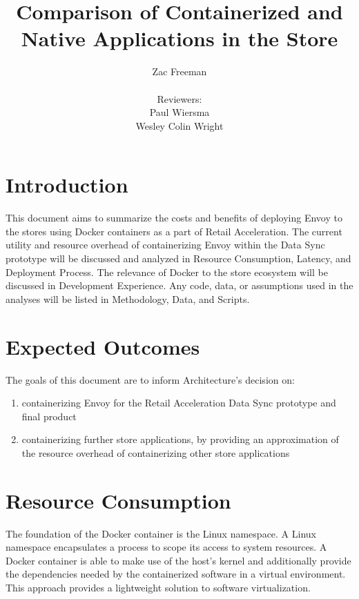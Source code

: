 \documentclass{article}
\begin{document}
\title{Comparison of Containerized and Native Applications in the Store}
\author{Zac Freeman\\\\Reviewers:\\Paul Wiersma\\ Wesley Colin Wright}

\maketitle

\section{Introduction}
This document aims to summarize the costs and benefits of deploying Envoy to the stores using Docker containers as a part of Retail Acceleration. The current utility and resource overhead of containerizing Envoy within the Data Sync prototype will be discussed and analyzed in Resource Consumption, Latency, and Deployment Process. The relevance of Docker to the store ecosystem will be discussed in Development Experience. Any code, data, or assumptions used in the analyses will be listed in Methodology, Data, and Scripts.

\section{Expected Outcomes}
The goals of this document are to inform Architecture's decision on:
\begin{enumerate}
    \item containerizing Envoy for the Retail Acceleration Data Sync prototype and final product
    \item containerizing further store applications, by providing an approximation of the resource overhead of containerizing other store applications
\end{enumerate}

\section{Resource Consumption}
The foundation of the Docker container is the Linux namespace. A Linux namespace encapsulates a process to scope its access to system resources. A Docker container is able to make use of the host's kernel and additionally provide the dependencies needed by the containerized software in a virtual environment. This approach provides a lightweight solution to software virtualization.
\end{document}
